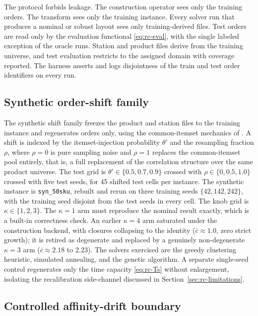 \documentclass[preprint,review,11pt,authoryear]{elsarticle}
\begin{document}
The protocol forbids leakage. The construction operator sees only the training orders. The transform sees only the training instance. Every solver run that produces a nominal or robust layout sees only training-derived files. Test orders are read only by the evaluation functional \eqref{eq:rc-eval}, with the single labeled exception of the oracle runs. Station and product files derive from the training universe, and test evaluation restricts to the assigned domain with coverage reported. The harness asserts and logs disjointness of the train and test order identifiers on every run.

\subsection{Synthetic order-shift family}\label{sec:rc-zhang}

The synthetic shift family freezes the product and station files to the training instance and regenerates orders only, using the common-itemset mechanics of \citet{zhang2019}. A shift is indexed by the itemset-injection probability $\theta'$ and the resampling fraction $\rho$, where $\rho=0$ is pure sampling noise and $\rho=1$ replaces the common-itemset pool entirely, that is, a full replacement of the correlation structure over the same product universe. The test grid is $\theta' \in \{0.5, 0.7, 0.9\}$ crossed with $\rho \in \{0, 0.5, 1.0\}$ crossed with five test seeds, for 45 shifted test cells per instance. The synthetic instance is \texttt{syn\_50sku}, rebuilt and rerun on three training seeds $\{42, 142, 242\}$, with the training seed disjoint from the test seeds in every cell. The knob grid is $\kappa \in \{1,2,3\}$. The $\kappa=1$ arm must reproduce the nominal result exactly, which is a built-in correctness check. An earlier $\kappa=4$ arm saturated under the construction backend, with closures collapsing to the identity ($\bar c \approx 1.0$, zero strict growth); it is retired as degenerate and replaced by a genuinely non-degenerate $\kappa=3$ arm ($\bar c \approx 2.18$ to $2.23$). The solvers exercised are the greedy clustering heuristic, simulated annealing, and the genetic algorithm. A separate single-seed control regenerates only the time capacity \eqref{eq:rc-Ts} without enlargement, isolating the recalibration side-channel discussed in Section~\ref{sec:rc-limitations}.

\subsection{Controlled affinity-drift boundary}\label{sec:rc-affinity}
\end{document}
